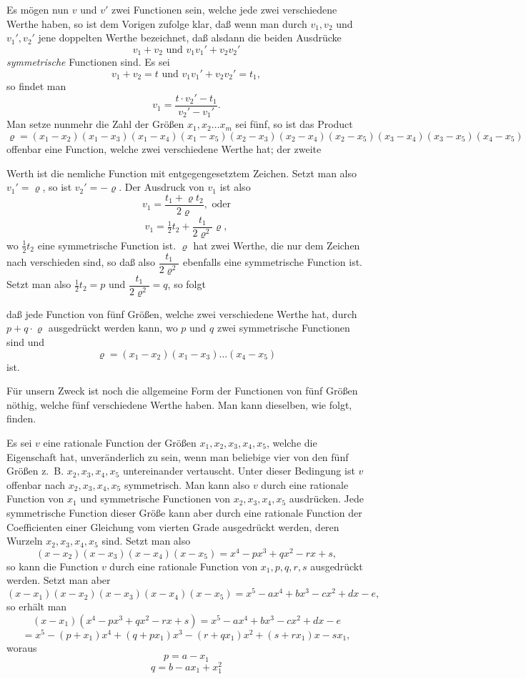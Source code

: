 \documentclass{article}
\begin{document}
Es mögen nun $v$ und $v'$ zwei Functionen sein, welche jede zwei verschiedene Werthe haben, so ist dem Vorigen zufolge klar, daß wenn man durch $v_1, v_2$ und $v_1', v_2'$ jene doppelten Werthe bezeichnet, daß alsdann die beiden Ausdrücke
\[ v_1 + v_2 \text{ und } v_1 v_1' + v_2 v_2' \]
\emph{symmetrische} Functionen sind. Es sei
\[ v_1 + v_2 = t \text{ und } v_1 v_1' + v_2 v_2' = t_1, \]
so findet man
\[ v_1 = \frac{t \cdot v_2' - t_1}{v_2' - v_1'}. \]
Man setze nunmehr die Zahl der Größen $x_1, x_2 \ldots x_m$ sei fünf, so ist das Product
\[ \varrho = (x_1 - x_2)(x_1 - x_3)(x_1 - x_4)(x_1 - x_5)(x_2 - x_3)(x_2 - x_4)(x_2 - x_5)(x_3 - x_4)(x_3 - x_5)(x_4 - x_5) \]
offenbar eine Function, welche zwei verschiedene Werthe hat; der zweite

Werth ist die nemliche Function mit entgegengesetztem Zeichen. Setzt man also $v_1' = \varrho$, so ist $v_2' = -\varrho$. Der Ausdruck von $v_1$ ist also
\[ v_1 = \frac{t_1 + \varrho t_2}{2\varrho}, \text{ oder} \]
\[ v_1 = \tfrac{1}{2} t_2 + \frac{t_1}{2\varrho^{2}} \varrho, \]
wo $\tfrac{1}{2} t_2$ eine symmetrische Function ist. $\varrho$ hat zwei Werthe, die nur dem Zeichen nach verschieden sind, so daß also $\dfrac{t_1}{2\varrho^{2}}$ ebenfalls eine symmetrische Function ist. Setzt man also $\tfrac{1}{2} t_2 = p$ und $\dfrac{t_1}{2\varrho^{2}} = q$, so folgt

daß jede Function von fünf Größen, welche zwei verschiedene Werthe hat, durch $p + q \cdot \varrho$ ausgedrückt werden kann, wo $p$ und $q$ zwei symmetrische Functionen sind und
\[ \varrho = (x_1 - x_2)(x_1 - x_3) \ldots (x_4 - x_5) \]
ist.

Für unsern Zweck ist noch die allgemeine Form der Functionen von fünf Größen nöthig, welche fünf verschiedene Werthe haben. Man kann dieselben, wie folgt, finden.

Es sei $v$ eine rationale Function der Größen $x_1, x_2, x_3, x_4, x_5$, welche die Eigenschaft hat, unveränderlich zu sein, wenn man beliebige vier von den fünf Größen z.\ B. $x_2, x_3, x_4, x_5$ untereinander vertauscht. Unter dieser Bedingung ist $v$ offenbar nach $x_2, x_3, x_4, x_5$ symmetrisch. Man kann also $v$ durch eine rationale Function von $x_1$ und symmetrische Functionen von $x_2, x_3, x_4, x_5$ ausdrücken. Jede symmetrische Function dieser Größe kann aber durch eine rationale Function der Coefficienten einer Gleichung vom vierten Grade ausgedrückt werden, deren Wurzeln $x_2, x_3, x_4, x_5$ sind. Setzt man also
\[ (x - x_2)(x - x_3)(x - x_4)(x - x_5) = x^{4} - px^{3} + qx^{2} - rx + s, \]
so kann die Function $v$ durch eine rationale Function von $x_1, p, q, r, s$ ausgedrückt werden. Setzt man aber
\[ (x - x_1)(x - x_2)(x - x_3)(x - x_4)(x - x_5) = x^{5} - ax^{4} + bx^{3} - cx^{2} + dx - e, \]
so erhält man
\[ (x - x_1)(x^{4} - px^{3} + qx^{2} - rx + s) = x^{5} - ax^{4} + bx^{3} - cx^{2} + dx - e \]
\[ = x^{5} - (p + x_1)x^{4} + (q + px_1)x^{3} - (r + qx_1)x^{2} + (s + rx_1)x - sx_1, \]
woraus
\[ p = a - x_1 \]
\[ q = b - ax_1 + x_1^{2} \]
\end{document}

